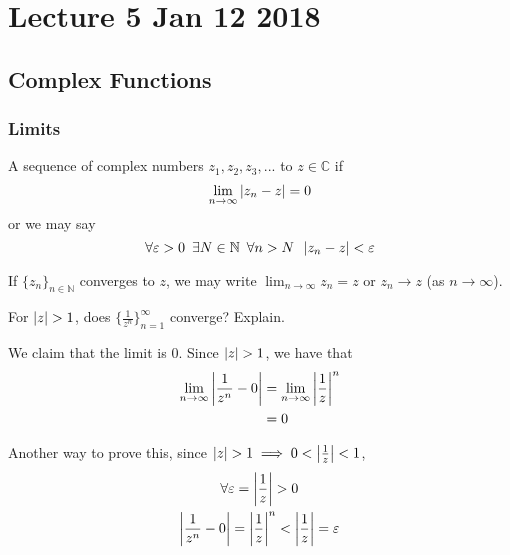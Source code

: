 \documentclass[notoc,notitlepage]{tufte-book}
\begin{document}


\chapter{Lecture 5 Jan 12 2018}
	\label{chapter:lecture_5_jan_12_2018}

\section{Complex Functions} %
\label{sec:complex_functions}

\subsection{Limits} %
\label{sub:limits}

\begin{defn}[Convergence]\label{defn:Convergence}
	A sequence of complex numbers $z_1, z_2, z_3, ...$  to $z \in \mathbb{C}$ if
	\begin{equation}
		\lim_{n \to \infty} \left|z_n - z\right| = 0
	\end{equation}
	or we may say
	\begin{equation}
		\forall \varepsilon > 0 \enspace \exists N \in \mathbb{N} \enspace \forall n > N \enspace \left|z_n - z\right| < \varepsilon
	\end{equation}
\end{defn}

\begin{note}
 If $\{z_n\}_{n \in \mathbb{N}}$ converges to $z$, we may write $\lim_{n \to \infty} z_n = z$ or $z_n \to z$ (as $n \to \infty$).
\end{note}

\begin{eg}
	For $\left|z\right| > 1$, does $\{\frac{1}{z^n}\}^\infty_{n = 1}$ converge? Explain.

	\begin{solution}
		We claim that the limit is 0. Since $\left|z\right| > 1$, we have that
		\begin{align*}
			\lim_{n \to \infty} \left|\frac{1}{z^n} - 0\right|
				&= \lim_{n \to \infty} \left|\frac{1}{z}\right|^n \\
				&= 0
		\end{align*}

		Another way to prove this, since $\left|z\right| > 1 \implies 0 < \left|\frac{1}{z}\right| < 1$,
		\begin{gather*}
			\forall \varepsilon = \left|\frac{1}{z}\right| > 0 \\
			\left|\frac{1}{z^n} - 0\right| = \left|\frac{1}{z}\right|^n < \left|\frac{1}{z}\right| = \varepsilon
		\end{gather*}
	\end{solution}
\end{eg}
\end{document}
